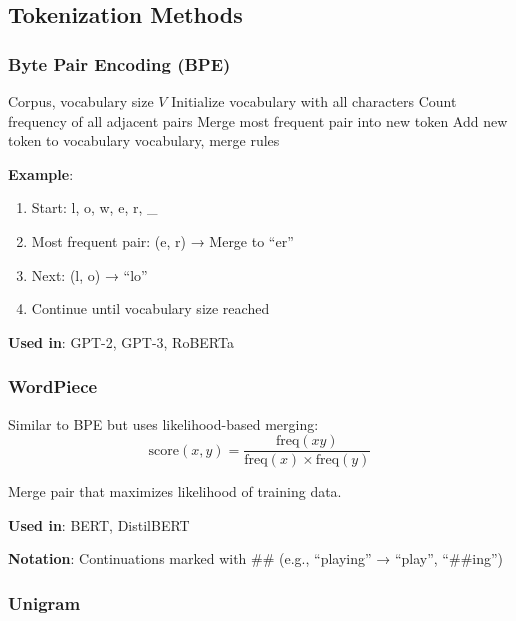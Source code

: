 \subsection{Tokenization Methods}

\subsubsection{Byte Pair Encoding (BPE)}

\begin{algorithm}[H]
\caption{BPE Training}
\begin{algorithmic}[1]
\REQUIRE Corpus, vocabulary size $V$
\STATE Initialize vocabulary with all characters
    \STATE Count frequency of all adjacent pairs
    \STATE Merge most frequent pair into new token
    \STATE Add new token to vocabulary
\ENDWHILE
\RETURN vocabulary, merge rules
\end{algorithmic}
\end{algorithm}

\textbf{Example}:
\begin{enumerate}
    \item Start: l, o, w, e, r, \_
    \item Most frequent pair: (e, r) → Merge to ``er''
    \item Next: (l, o) → ``lo''
    \item Continue until vocabulary size reached
\end{enumerate}

\textbf{Used in}: GPT-2, GPT-3, RoBERTa

\subsubsection{WordPiece}

Similar to BPE but uses likelihood-based merging:
\begin{equation}
\text{score}(x, y) = \frac{\text{freq}(xy)}{\text{freq}(x) \times \text{freq}(y)}
\end{equation}

Merge pair that maximizes likelihood of training data.

\textbf{Used in}: BERT, DistilBERT

\textbf{Notation}: Continuations marked with \#\# (e.g., ``playing'' → ``play'', ``\#\#ing'')

\subsubsection{Unigram}

